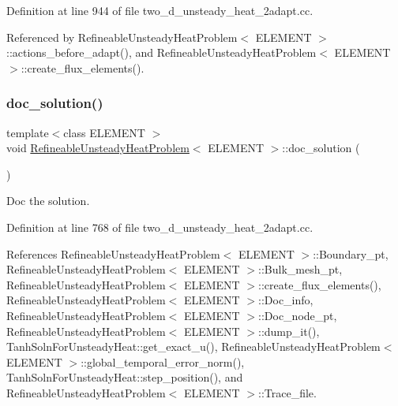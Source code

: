 Definition at line 944 of file two\+\_\+d\+\_\+unsteady\+\_\+heat\+\_\+2adapt.\+cc.



Referenced by Refineable\+Unsteady\+Heat\+Problem$<$ E\+L\+E\+M\+E\+N\+T $>$\+::actions\+\_\+before\+\_\+adapt(), and Refineable\+Unsteady\+Heat\+Problem$<$ E\+L\+E\+M\+E\+N\+T $>$\+::create\+\_\+flux\+\_\+elements().

\mbox{\label{classRefineableUnsteadyHeatProblem_a77d590171785b6b5f4070af9401c0e37}} 
\subsubsection{\texorpdfstring{doc\+\_\+solution()}{doc\_solution()}}
{\footnotesize\ttfamily template$<$class E\+L\+E\+M\+E\+NT $>$ \\
void \hyperlink{classRefineableUnsteadyHeatProblem}{Refineable\+Unsteady\+Heat\+Problem}$<$ E\+L\+E\+M\+E\+NT $>$\+::doc\+\_\+solution (\begin{DoxyParamCaption}{ }\end{DoxyParamCaption})}



Doc the solution. 



Definition at line 768 of file two\+\_\+d\+\_\+unsteady\+\_\+heat\+\_\+2adapt.\+cc.



References Refineable\+Unsteady\+Heat\+Problem$<$ E\+L\+E\+M\+E\+N\+T $>$\+::\+Boundary\+\_\+pt, Refineable\+Unsteady\+Heat\+Problem$<$ E\+L\+E\+M\+E\+N\+T $>$\+::\+Bulk\+\_\+mesh\+\_\+pt, Refineable\+Unsteady\+Heat\+Problem$<$ E\+L\+E\+M\+E\+N\+T $>$\+::create\+\_\+flux\+\_\+elements(), Refineable\+Unsteady\+Heat\+Problem$<$ E\+L\+E\+M\+E\+N\+T $>$\+::\+Doc\+\_\+info, Refineable\+Unsteady\+Heat\+Problem$<$ E\+L\+E\+M\+E\+N\+T $>$\+::\+Doc\+\_\+node\+\_\+pt, Refineable\+Unsteady\+Heat\+Problem$<$ E\+L\+E\+M\+E\+N\+T $>$\+::dump\+\_\+it(), Tanh\+Soln\+For\+Unsteady\+Heat\+::get\+\_\+exact\+\_\+u(), Refineable\+Unsteady\+Heat\+Problem$<$ E\+L\+E\+M\+E\+N\+T $>$\+::global\+\_\+temporal\+\_\+error\+\_\+norm(), Tanh\+Soln\+For\+Unsteady\+Heat\+::step\+\_\+position(), and Refineable\+Unsteady\+Heat\+Problem$<$ E\+L\+E\+M\+E\+N\+T $>$\+::\+Trace\+\_\+file.



